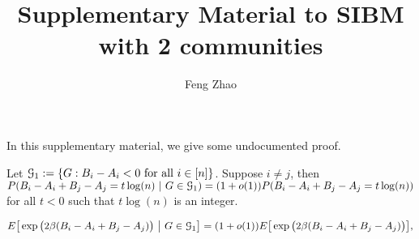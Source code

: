\documentclass{article}
\title{Supplementary Material to SIBM with 2 communities}
\author{Feng Zhao}
\begin{document}
\maketitle
In this supplementary material, we give some undocumented proof.
\begin{lemma}\label{lem:ucBA}
Let $\mathcal{G}_1:=\{G:B_i-A_i<0\text{~for all~}i\in[n]\}$. Suppose $i\neq j$, then $P(B_i-A_i + B_j - A_j= t\log(n)~|~G\in\mathcal{G}_1)= (1+o(1))P(B_i-A_i + B_j - A_j= t\log(n))$ for all $t<0$ such that $t\log(n)$ is an integer.
\end{lemma}
\begin{lemma}\label{lem:BijG}
\begin{equation} 
E \big[  \exp\big(2\beta (B_i-A_i + B_j - A_j) \big) ~\big|~ G\in\mathcal{G}_1 \big] 
= (1+o(1)) E \big[  \exp\big(2\beta (B_i-A_i + B_j - A_j) \big) \big] ,
\end{equation}
\end{lemma}
\end{document}
